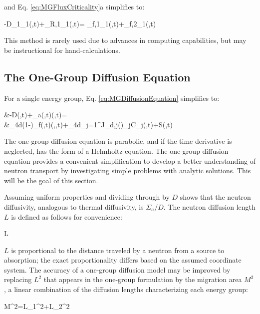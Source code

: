 and Eq. \eqref{eq:MGFluxCriticality}a simplifies to:

\beq
-\nabla\cdot\left\lbrack D_1\nabla\phi_1(,t)\right\rbrack+\Sigma_{R,1}\phi_1(,t)=
\left\lbrack\nu\Sigma_{f,1}\phi_1(,t)+\nu\Sigma_{f,2}\phi_1(,t)\right\rbrack\\
\eeq

This method is rarely used due to advances in computing capabilities, but may be instructional for hand-calculations.

\subsection{The One-Group Diffusion Equation}
For a single energy group, Eq. \eqref{eq:MGDiffusionEquation} simplifies to:

\beqa
\label{eq:1GDiffusionEquation}
&-\nabla\cdot\left\lbrack D\nabla\phi(,t)\right\rbrack+\Sigma_a(,t)\phi(,t)=\\
&\hspace{1cm}\int_{4\pi}d\hO(1-\beta)\nu\Sigma_f(,t)\phi(,\hO,t)+\int_{4\pi}d\hO\sum_{j=1}^J\chi_{d,j}(\hO)\lambda_jC_j(,t)+S(,t)
\eeqa

The one-group diffusion equation is parabolic, and if the time derivative is neglected, has the form of a Helmholtz equation. The one-group diffusion equation provides a convenient simplification to develop a better understanding of neutron transport by investigating simple problems with analytic solutions. This will be the goal of this section. 

Assuming uniform properties and dividing through by \(D\) shows that the neutron diffusivity, analogous to thermal diffusivity, is \(\Sigma_a/D\). The neutron diffusion length \(L\) is defined as follows for convenience:

\beq
\label{eq:DiffusionLength}
L\equiv{}
\eeq

\(L\) is proportional to the distance traveled by a neutron from a source to absorption; the exact proportionality differs based on the assumed coordinate system. The accuracy of a one-group diffusion model may be improved by replacing \(L^2\) that appears in the one-group formulation by the migration area \(M^2\), a linear combination of the diffusion lengths characterizing each energy group:

\beq
M^2=L_1^2+L_2^2
\eeq

